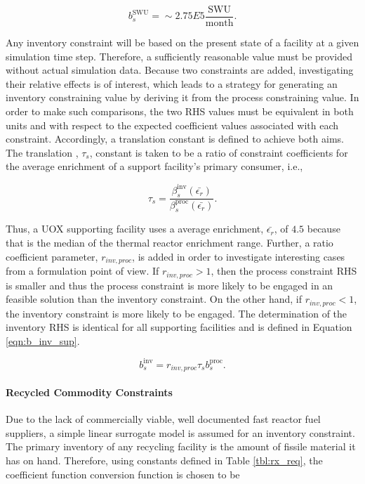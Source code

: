 \begin{equation}
b^{\text{SWU}}_s = \sim 2.75E5 \frac{\text{SWU}}{\text{month}}.
\end{equation}

Any inventory constraint will be based on the present state of a facility at a
given simulation time step. Therefore, a sufficiently reasonable value must be
provided without actual simulation data. Because two constraints are added,
investigating their relative effects is of interest, which leads to a strategy
for generating an inventory constraining value by deriving it from the process
constraining value. In order to make such comparisons, the two RHS values must
be equivalent in both units and with respect to the expected coefficient values
associated with each constraint. Accordingly, a translation constant is defined
to achieve both aims. The translation , $\tau_s$, constant is taken to be a
ratio of constraint coefficients for the average enrichment of a support
facility's primary consumer, i.e.,

\begin{equation}
\tau_s = \frac{\beta^{\text{inv}}_s(\bar{\epsilon_r})}{\beta^{\text{proc}}_s(\bar{\epsilon_r})}.
\end{equation}

\noindent
Thus, a UOX supporting facility uses a average enrichment, $\bar{\epsilon_r}$,
of $4.5$ because that is the median of the thermal reactor enrichment
range. Further, a ratio coefficient parameter, $r_{inv, proc}$, is added in
order to investigate interesting cases from a formulation point of view. If
$r_{inv, proc} > 1$, then the process constraint RHS is smaller and thus the
process constraint is more likely to be engaged in an feasible solution than the
inventory constraint. On the other hand, if $r_{inv, proc} < 1$, the inventory
constraint is more likely to be engaged. The determination of the inventory RHS
is identical for all supporting facilities and is defined in Equation
\ref{eqn:b_inv_sup}.

\begin{equation}\label{eqn:b_inv_sup}
b^{\text{inv}}_s = 
r_{inv, proc} \tau_s b^{\text{proc}}_s.
\end{equation}


\paragraph{Recycled Commodity Constraints}

Due to the lack of commercially viable, well documented fast reactor fuel
suppliers, a simple linear surrogate model is assumed for an inventory
constraint. The primary inventory of any recycling facility is the amount of
fissile material it has on hand. Therefore, using constants defined in Table
\ref{tbl:rx_req}, the coefficient function conversion function is chosen to be

